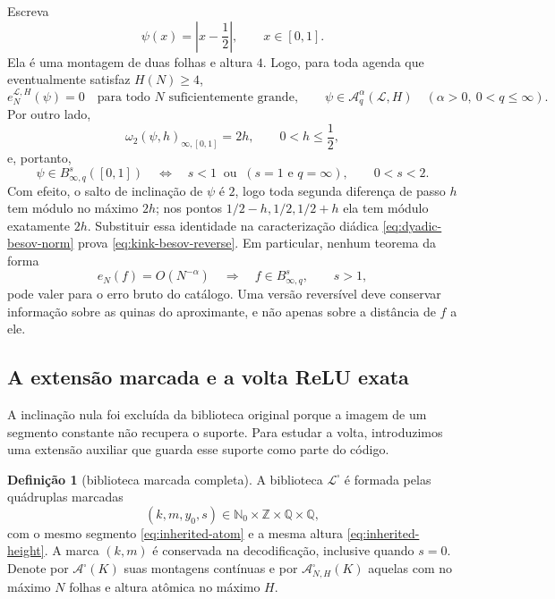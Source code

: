 \documentclass[11pt,a4paper]{article}
\theoremstyle{definition}
\newtheorem{definition}[theorem]{Definição}
\theoremstyle{remark}
\newcommand{\Nzero}{\mathbb{N}_0}
\newcommand{\Aclass}{\mathcal{A}}
\newcommand{\Library}{\mathcal{L}}
\begin{document}
Escreva
\begin{equation}
 \psi(x)=\left|x-\frac12\right|,
 \qquad x\in[0,1].
 \label{eq:reverse-kink}
\end{equation}
Ela é uma montagem de duas folhas e altura $4$. Logo, para toda agenda que
eventualmente satisfaz $H(N)\ge4$,
\begin{equation}
 e_N^{\Library,H}(\psi)=0
 \quad\text{para todo $N$ suficientemente grande},
 \qquad
 \psi\in\mathscr A_q^\alpha(\Library,H)
 \quad(\alpha>0,\ 0<q\le\infty).
 \label{eq:kink-zero-raw-error}
\end{equation}
Por outro lado,
\begin{equation}
 \omega_2(\psi,h)_{\infty,[0,1]}=2h,
 \qquad 0<h\le\frac12,
 \label{eq:kink-exact-modulus-reverse}
\end{equation}
e, portanto,
\begin{equation}
 \psi\in B^s_{\infty,q}([0,1])
 \quad\Longleftrightarrow\quad
 s<1\ \text{ ou }\ (s=1\text{ e }q=\infty),
 \qquad 0<s<2.
 \label{eq:kink-besov-reverse}
\end{equation}
Com efeito, o salto de inclinação de $\psi$ é $2$, logo toda segunda diferença
de passo $h$ tem módulo no máximo $2h$; nos pontos
$1/2-h,1/2,1/2+h$ ela tem módulo exatamente $2h$. Substituir essa identidade
na caracterização diádica \eqref{eq:dyadic-besov-norm} prova
\eqref{eq:kink-besov-reverse}. Em particular, nenhum
teorema da forma
\begin{equation}
 e_N(f)=O(N^{-\alpha})\quad\Longrightarrow\quad
 f\in B^s_{\infty,q},
 \qquad s>1,
 \label{eq:forbidden-unregularized-converse}
\end{equation}
pode valer para o erro bruto do catálogo. Uma versão reversível deve conservar
informação sobre as quinas do aproximante, e não apenas sobre a distância de
$f$ a ele.

\subsection{A extensão marcada e a volta ReLU exata}

A inclinação nula foi
excluída da biblioteca original porque a imagem de um segmento constante não
recupera o suporte. Para estudar a volta, introduzimos uma extensão auxiliar
que guarda esse suporte como parte do código.

\begin{definition}[biblioteca marcada completa]
\label{def:marked-completion}
A biblioteca $\Library^\square$ é formada pelas quádruplas marcadas
\begin{equation}
 (k,m,y_0,s)\in\Nzero\times\mathbb Z\times\mathbb Q\times\mathbb Q,
 \label{eq:marked-atoms}
\end{equation}
com o mesmo segmento \eqref{eq:inherited-atom} e a mesma altura
\eqref{eq:inherited-height}. A marca $(k,m)$ é conservada na decodificação,
inclusive quando $s=0$. Denote por $\Aclass^\square(K)$ suas montagens
contínuas e por $\Aclass^\square_{N,H}(K)$ aquelas com no máximo $N$
folhas e altura atômica no máximo $H$.
\end{definition}
\end{document}

